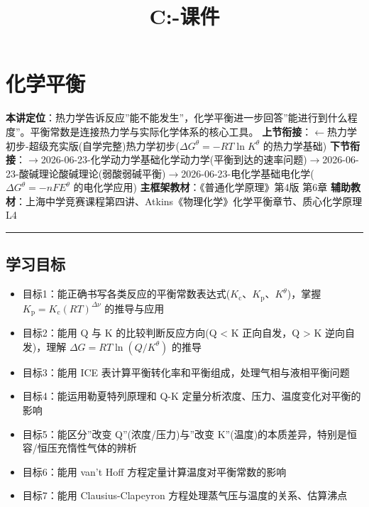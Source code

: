 \documentclass[a4paper,11pt]{ctexart}
\title{C:\Obsidion\妙妙屋\04-课件\学生讲义\化学平衡}
\date{}
\providecommand{\tightlist}{\setlength{\itemsep}{0pt}\setlength{\parskip}{0pt}}
\newcommand{\箭}{\ensuremath{\rightarrow}}
\newcommand{\左箭}{\ensuremath{\leftarrow}}
\newcommand{\上箭}{\ensuremath{\uparrow}}
\newcommand{\下箭}{\ensuremath{\downarrow}}
\newcommand{\衡}{\ensuremath{\rightleftharpoons}}
\newcommand{\双箭}{\ensuremath{\leftrightarrow}}
\newcommand{\约等于}{\ensuremath{\approx}}
\newcommand{\小于等于}{\ensuremath{\leq}}
\newcommand{\大于等于}{\ensuremath{\geq}}
\newcommand{\不等于}{\ensuremath{\neq}}
\newcommand{\西格马}{\ensuremath{\sigma}}
\newcommand{\派}{\ensuremath{\pi}}
\begin{document}
\maketitle
\tableofcontents
\newpage
\section{化学平衡}\label{ux5316ux5b66ux5e73ux8861}

\textbf{本讲定位}：热力学告诉反应''能不能发生''，化学平衡进一步回答''能进行到什么程度''。平衡常数是连接热力学与实际化学体系的核心工具。
\textbf{上节衔接}：\左箭 热力学初步-超级充实版(自学完整)\textbar 热力学初步(\(\Delta G^\theta = -RT \ln K^\theta\) 的热力学基础)
\textbf{下节衔接}：\箭 2026-06-23-化学动力学基础\textbar 化学动力学(平衡到达的速率问题)\箭 2026-06-23-酸碱理论\textbar 酸碱理论(弱酸弱碱平衡)\箭 2026-06-23-电化学基础\textbar 电化学(\(\Delta G^\theta = -nFE^\theta\) 的电化学应用)
\textbf{主框架教材}：《普通化学原理》第4版 第6章
\textbf{辅助教材}：上海中学竞赛课程第四讲、Atkins《物理化学》化学平衡章节、质心化学原理L4

\begin{center}\rule{0.5\linewidth}{0.5pt}\end{center}

\subsection{学习目标}\label{ux5b66ux4e60ux76eeux6807}

\begin{itemize}
\tightlist
\item
  目标1：能正确书写各类反应的平衡常数表达式(\(K_{\mathrm c}\)、\(K_{\mathrm p}\)、\(K^\theta\))，掌握 \(K_{\mathrm p} = K_{\mathrm c}(RT)^{\Delta\nu}\) 的推导与应用
\item
  目标2：能用 Q 与 K 的比较判断反应方向(Q \textless{} K 正向自发，Q \textgreater{} K 逆向自发)，理解 \(\Delta G = RT \ln(Q/K^\theta)\) 的推导
\item
  目标3：能用 ICE 表计算平衡转化率和平衡组成，处理气相与液相平衡问题
\item
  目标4：能运用勒夏特列原理和 Q-K 定量分析浓度、压力、温度变化对平衡的影响
\item
  目标5：能区分''改变 Q''(浓度/压力)与''改变 K''(温度)的本质差异，特别是恒容/恒压充惰性气体的辨析
\item
  目标6：能用 van't Hoff 方程定量计算温度对平衡常数的影响
\item
  目标7：能用 Clausius-Clapeyron 方程处理蒸气压与温度的关系、估算沸点
\end{itemize}
\end{document}
